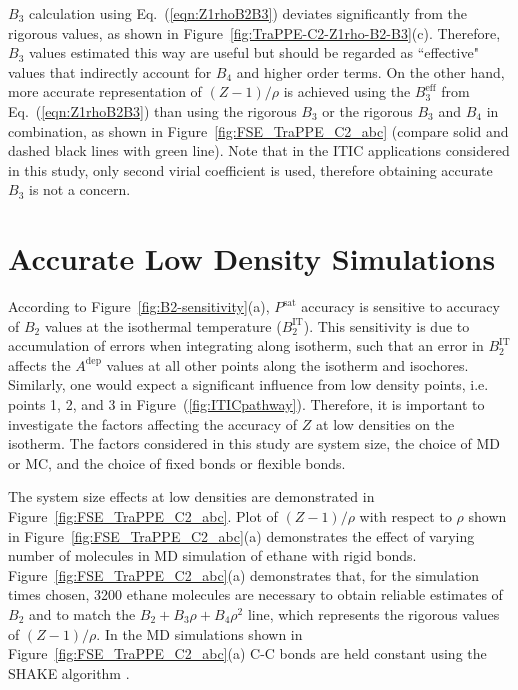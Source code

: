 \documentclass[5p,times]{elsarticle}
\begin{document}
$B_3$ calculation using Eq.~(\ref{eqn:Z1rhoB2B3}) deviates significantly from the rigorous values, as shown in Figure~\ref{fig:TraPPE-C2-Z1rho-B2-B3}(c). Therefore, $B_3$ values estimated this way are useful but should be regarded as ``effective" values that indirectly account for $B_4$ and higher order terms. On the other hand, more accurate representation of $(Z-1)/\rho$ is achieved using the $B_3^\mathrm{eff}$ from Eq.~(\ref{eqn:Z1rhoB2B3}) than using the rigorous $B_3$ or the rigorous $B_3$ and $B_4$ in combination, as shown in Figure~\ref{fig:FSE_TraPPE_C2_abc} (compare solid and dashed black lines with green line). Note that in the ITIC applications considered in this study, only second virial coefficient is used, therefore obtaining accurate $B_3$ is not a concern.


\section{Accurate Low Density Simulations}\label{sec:FSE}
According to Figure~\ref{fig:B2-sensitivity}(a), $P^{\mathrm{sat}}$ accuracy is sensitive to accuracy of $B_2$ values at the isothermal temperature ($B_2^{\mathrm{IT}}$). This sensitivity is due to accumulation of errors when integrating along isotherm, such that an error in $B_2^{\mathrm{IT}}$ affects the $A^{\mathrm{dep}}$ values at all other points along the isotherm and isochores. Similarly, one would expect a significant influence from low density points, i.e. points 1, 2, and 3 in Figure~(\ref{fig:ITICpathway}). Therefore, it is important to investigate the factors affecting the accuracy of $Z$ at low densities on the isotherm. The factors considered in this study are system size, the choice of MD or MC, and the choice of fixed bonds or flexible bonds. 

The system size effects at low densities are demonstrated in Figure~\ref{fig:FSE_TraPPE_C2_abc}. Plot of $(Z-1)/\rho$ with respect to $\rho$ shown in Figure~\ref{fig:FSE_TraPPE_C2_abc}(a) demonstrates the effect of varying number of molecules in MD simulation of ethane with rigid bonds. Figure~\ref{fig:FSE_TraPPE_C2_abc}(a) demonstrates that, for the simulation times chosen, 3200 ethane molecules are necessary to obtain reliable estimates of $B_2$ and to match the $B_2+B_3 \rho+B_4 \rho^2$ line, which represents the rigorous values of $(Z-1)/\rho$. In the MD simulations shown in Figure~\ref{fig:FSE_TraPPE_C2_abc}(a) C-C bonds are held constant using the SHAKE algorithm \cite{Ryckaert1977}. 
\end{document}

